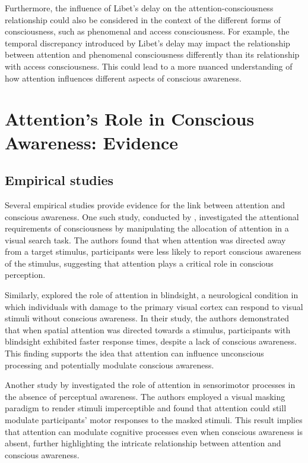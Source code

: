 \documentclass[10pt]{article}
\begin{document}
\begin{sloppypar}
  Furthermore, the influence of Libet’s delay on the attention-consciousness relationship could also be considered in the context of the different forms of consciousness, such as phenomenal and access consciousness. For example, the temporal discrepancy introduced by Libet’s delay may impact the relationship between attention and phenomenal consciousness differently than its relationship with access consciousness. This could lead to a more nuanced understanding of how attention influences different aspects of conscious awareness.

  \section{Attention's Role in Conscious Awareness: Evidence}
  \label{sec:evidence}

  \subsection{Empirical studies}
  \label{sec:empirical}

  Several empirical studies provide evidence for the link between attention and conscious awareness. One such study, conducted by \cite{cohen_attentional_2012}, investigated the attentional requirements of consciousness by manipulating the allocation of attention in a visual search task. The authors found that when attention was directed away from a target stimulus, participants were less likely to report conscious awareness of the stimulus, suggesting that attention plays a critical role in conscious perception.

  Similarly, \cite{kentridge_spatial_2004} explored the role of attention in blindsight, a neurological condition in which individuals with damage to the primary visual cortex can respond to visual stimuli without conscious awareness. In their study, the authors demonstrated that when spatial attention was directed towards a stimulus, participants with blindsight exhibited faster response times, despite a lack of conscious awareness. This finding supports the idea that attention can influence unconscious processing and potentially modulate conscious awareness.

  Another study by \cite{sumner_attentional_2006} investigated the role of attention in sensorimotor processes in the absence of perceptual awareness. The authors employed a visual masking paradigm to render stimuli imperceptible and found that attention could still modulate participants' motor responses to the masked stimuli. This result implies that attention can modulate cognitive processes even when conscious awareness is absent, further highlighting the intricate relationship between attention and conscious awareness.


\end{sloppypar}
\end{document}
